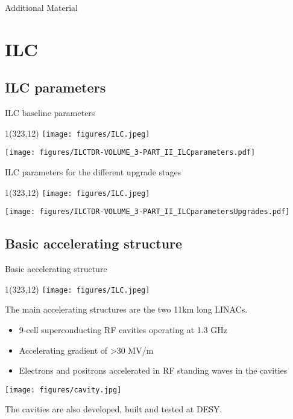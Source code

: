 \documentclass[xcolor={dvipsnames}]{beamer}
\newcommand{\ilclogo}{
  \setlength{\TPHorizModule}{1pt}
  \setlength{\TPVertModule}{1pt}
  \begin{textblock}{1}(323,12)
   \texttt{[image: figures/ILC.jpeg]}
  \end{textblock}
}
\begin{document}
\appendix

\begin{frame}
\begin{center}
\LARGE Additional Material
\end{center}
  \tableofcontents
\end{frame}

\section{ILC}
\subsection{ILC parameters}
\begin{frame}{ILC baseline parameters}
\ilclogo
\centering
	\texttt{[image: figures/ILCTDR-VOLUME\_3-PART\_II\_ILCparameters.pdf]}
\end{frame}
\begin{frame}{ILC parameters for the different upgrade stages}
\ilclogo
\centering
	\texttt{[image: figures/ILCTDR-VOLUME\_3-PART\_II\_ILCparametersUpgrades.pdf]}
\end{frame}

\subsection{Basic accelerating structure}
\begin{frame}{Basic accelerating structure}
\ilclogo
The main accelerating structures are the two 11km long LINACs.
\begin{itemize}
\item 9-cell superconducting RF cavities operating at 1.3 GHz 
\item Accelerating gradient of >30 MV/m
\item Electrons and positrons accelerated in RF standing waves in the cavities 
\end{itemize}
\begin{center}
\texttt{[image: figures/cavity.jpg]}
\end{center}
The cavities are also developed, built and tested at DESY.
\end{frame}
\end{document}
